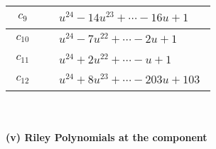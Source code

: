 \documentclass[1p]{elsarticle_modified}
\theoremstyle{definition}
\begin{document}
\begin{tabular}{m{50pt}|m{274pt}}
\hline $$\begin{aligned}c_{9}\end{aligned}$$&$\begin{aligned}
&u^{24}-14 u^{23}+\cdots-16 u+1
\end{aligned}$\\
\hline $$\begin{aligned}c_{10}\end{aligned}$$&$\begin{aligned}
&u^{24}-7 u^{22}+\cdots-2 u+1
\end{aligned}$\\
\hline $$\begin{aligned}c_{11}\end{aligned}$$&$\begin{aligned}
&u^{24}+2 u^{22}+\cdots- u+1
\end{aligned}$\\
\hline $$\begin{aligned}c_{12}\end{aligned}$$&$\begin{aligned}
&u^{24}+8 u^{23}+\cdots-203 u+103
\end{aligned}$\\
\hline
\end{tabular}\\~\\
\newpage\renewcommand{\arraystretch}{1}
\flushleft \textbf{(v) Riley Polynomials at the component}\newline \\
\end{document}
